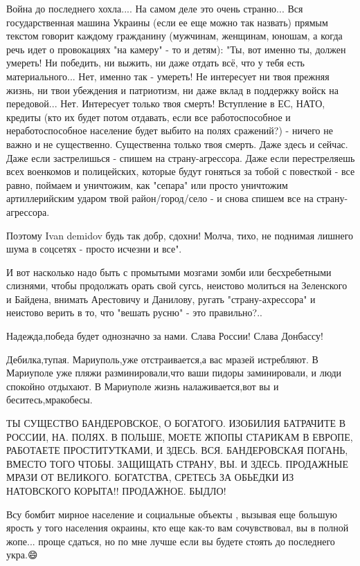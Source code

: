 Война до последнего хохла....
На самом деле это очень странно... 
Вся государственная машина Украины (если ее еще можно так назвать) прямым текстом говорит каждому гражданину (мужчинам, женщинам, юношам, а когда речь идет о провокациях "на камеру" - то и детям): 
"Ты, вот именно ты, должен умереть! Ни победить, ни выжить, ни даже отдать всё, что у тебя есть материального... 
Нет, именно так - умереть! Не интересует ни твоя прежняя жизнь, ни твои убеждения и патриотизм, ни даже вклад в поддержку войск на передовой... Нет. 
Интересует только твоя смерть! 
Вступление в ЕС, НАТО, кредиты (кто их будет потом отдавать, если все работоспособное и неработоспособное население будет выбито на полях сражений?) - ничего не важно и не существенно. 
Существенна только твоя смерть. Даже здесь и сейчас. Даже если застрелишься - спишем на страну-агрессора. Даже если перестреляешь всех военкомов и полицейских, которые будут гоняться за тобой с повесткой - все равно, поймаем и уничтожим, как "сепара" или просто уничтожим артиллерийским ударом твой район/город/село - и снова спишем все на страну-агрессора.

Поэтому Ivan demidov будь так добр, сдохни!
Молча, тихо, не поднимая лишнего шума в соцсетях - просто исчезни и все".

И вот насколько надо быть с промытыми мозгами зомби или бесхребетными слизнями, чтобы продолжать орать свой сугсь, неистово молиться на Зеленского и Байдена, внимать Арестовичу и Данилову, ругать "страну-ахрессора" и неистово верить в то, что "вешать русню" - это правильно?..

Надежда,победа будет однозначно за нами. Слава России! Слава Донбассу!


Дебилка,тупая. Мариуполь,уже отстраивается,а вас мразей истребляют. В Мариуполе
уже пляжи разминировали,что ваши пидоры заминировали, и люди спокойно отдыхают.
В Мариуполе жизнь налаживается,вот вы и беситесь,мракобесы.


ТЫ СУЩЕСТВО БАНДЕРОВСКОЕ, О БОГАТОГО. ИЗОБИЛИЯ БАТРАЧИТЕ В РОССИИ, НА. ПОЛЯХ. В
ПОЛЬШЕ, МОЕТЕ ЖПОПЫ СТАРИКАМ В ЕВРОПЕ, РАБОТАЕТЕ ПРОСТИТУТКАМИ, И ЗДЕСЬ. ВСЯ.
БАНДЕРОВСКАЯ ПОГАНЬ, ВМЕСТО ТОГО ЧТОБЫ. ЗАЩИЩАТЬ СТРАНУ, ВЫ. И ЗДЕСЬ. ПРОДАЖНЫЕ
МРАЗИ ОТ ВЕЛИКОГО. БОГАТСТВА, СРЕТЕСЬ ЗА ОБЬЕДКИ ИЗ НАТОВСКОГО КОРЫТА!!
ПРОДАЖНОЕ. БЫДЛО!


Всу бомбит мирное население и социальные объекты , вызывая еще большую ярость у
того населения окраины, кто еще как-то вам сочувствовал, вы в полной жопе...
проще сдаться, но по мне лучше если вы будете стоять до последнего укра.😄
